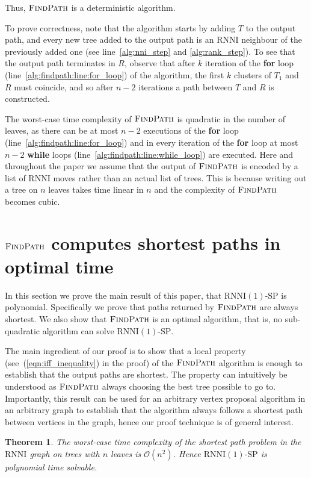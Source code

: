 \documentclass[11pt]{amsart}
\newtheorem{theorem}{Theorem}
\newcommand{\rnni}{\mathrm{RNNI}}
\newcommand{\findpath}{\textsc{FindPath}}
\newcommand{\decprob}[1]{\rnni(#1)\text{-}\mathrm{SP}}
\renewcommand{\O}{\mathcal O}
\begin{document}
Thus, $\findpath$ is a deterministic algorithm.

To prove correctness, note that the algorithm starts by adding $T$ to the output path, and every new tree added to the output path is an $\rnni$ neighbour of the previously added one (see line~\ref{alg:nni_step} and \ref{alg:rank_step}).
To see that the output path terminates in $R$, observe that after $k$ iteration of the \textbf{for} loop (line~\ref{alg:findpath:line:for_loop}) of the algorithm, the first $k$ clusters of $T_1$ and $R$ must coincide, and so after $n-2$ iterations a path between $T$ and $R$ is constructed.

The worst-case time complexity of $\findpath$ is quadratic in the number of leaves, as there can be at most $n-2$ executions of the \textbf{for} loop (line~\ref{alg:findpath:line:for_loop}) and in every iteration of the \textbf{for} loop at most $n-2$ \textbf{while} loops (line~\ref{alg:findpath:line:while_loop}) are executed.
Here and throughout the paper we assume that the output of $\findpath$ is encoded by a list of $\rnni$ moves rather than an actual list of trees.
This is because writing out a tree on $n$ leaves takes time linear in $n$ and the complexity of $\findpath$ becomes cubic.
\endproof


\section{$\findpath$ computes shortest paths in optimal time}

In this section we prove the main result of this paper, that $\decprob{1}$ is polynomial.
Specifically we prove that paths returned by $\findpath$ are always shortest.
We also show that $\findpath$ is an optimal algorithm, that is, no sub-quadratic algorithm can solve $\decprob{1}$.

The main ingredient of our proof is to show that a local property (see~(\ref{eqn:iff_inequality}) in the proof) of the $\findpath$ algorithm is enough to establish that the output paths are shortest.
The property can intuitively be understood as $\findpath$ always choosing the best tree possible to go to.
Importantly, this result can be used for an arbitrary vertex proposal algorithm in an arbitrary graph to establish that the algorithm always follows a shortest path between vertices in the graph, hence our proof technique is of general interest.

\begin{theorem}
The worst-case time complexity of the shortest path problem in the $\rnni$ graph on trees with $n$ leaves is $\O(n^2)$.
Hence $\decprob{1}$ is polynomial time solvable.
\label{thm:rnni_polynomial}
\end{theorem}
\end{document}

